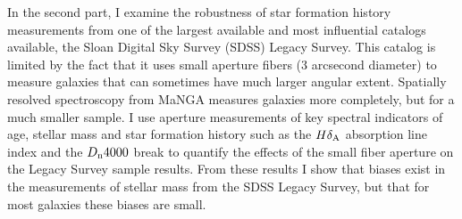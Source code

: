In the second part, I examine the robustness of star formation history measurements from one of the largest available and most influential catalogs available, the Sloan Digital Sky Survey (SDSS) Legacy Survey. This catalog is limited by the fact that it uses small aperture fibers (3 arcsecond diameter) to measure galaxies that can sometimes have much larger angular extent. Spatially resolved spectroscopy from MaNGA measures galaxies more completely, but for a much smaller sample. I use aperture measurements of key spectral indicators of age, stellar mass and star formation history such as the $H \delta_{\rm A}$ absorption line index and the $D_{\rm n}4000$ break to quantify the effects of the small fiber aperture on the Legacy Survey sample results. From these results I show that biases exist in the measurements of stellar mass from the SDSS Legacy Survey, but that for most galaxies these biases are small.\\
